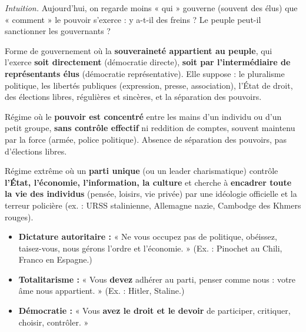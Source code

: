 \documentclass[11pt]{article}
\begin{document}
\emph{Intuition.} Aujourd'hui, on regarde moins « qui » gouverne (souvent des élus) que « comment » le pouvoir s'exerce : y a-t-il des freins ? Le peuple peut-il sanctionner les gouvernants ?

\begin{definition}[Démocratie]
Forme de gouvernement où la \textbf{souveraineté appartient au peuple}, qui l'exerce \textbf{soit directement} (démocratie directe), \textbf{soit par l'intermédiaire de représentants élus} (démocratie représentative). Elle suppose : le pluralisme politique, les libertés publiques (expression, presse, association), l'État de droit, des élections libres, régulières et sincères, et la séparation des pouvoirs.
\end{definition}

\begin{definition}[Dictature]
Régime où le \textbf{pouvoir est concentré} entre les mains d'un individu ou d'un petit groupe, \textbf{sans contrôle effectif} ni reddition de comptes, souvent maintenu par la force (armée, police politique). Absence de séparation des pouvoirs, pas d'élections libres.
\end{definition}

\begin{definition}[Totalitarisme]
Régime extrême où un \textbf{parti unique} (ou un leader charismatique) contrôle \textbf{l'État, l'économie, l'information, la culture} et cherche à \textbf{encadrer toute la vie des individus} (pensée, loisirs, vie privée) par une idéologie officielle et la terreur policière (ex. : URSS stalinienne, Allemagne nazie, Cambodge des Khmers rouges).
\end{definition}

\begin{aretenir}
\begin{itemize}
\item \textbf{Dictature autoritaire :} « Ne vous occupez pas de politique, obéissez, taisez-vous, nous gérons l'ordre et l'économie. » (Ex. : Pinochet au Chili, Franco en Espagne.)
\item \textbf{Totalitarisme :} « Vous \textbf{devez} adhérer au parti, penser comme nous : votre âme nous appartient. » (Ex. : Hitler, Staline.)
\item \textbf{Démocratie :} « Vous \textbf{avez le droit et le devoir} de participer, critiquer, choisir, contrôler. »
\end{itemize}
\end{aretenir}
\end{document}
